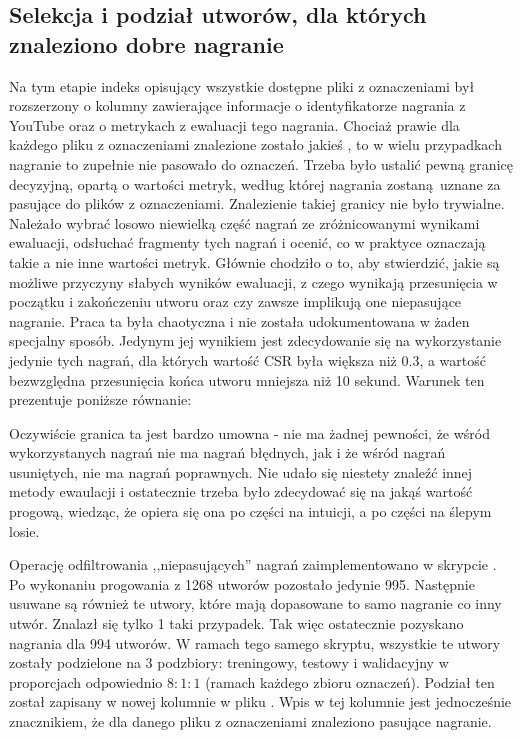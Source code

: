 \subsection{Selekcja i podział utworów, dla których znaleziono dobre nagranie}
Na tym etapie indeks opisujący wszystkie dostępne pliki z oznaczeniami był rozszerzony o kolumny
zawierające informacje o identyfikatorze nagrania z YouTube oraz o metrykach z ewaluacji tego
nagrania. Chociaż prawie dla każdego pliku z oznaczeniami znalezione zostało jakieś
, to w wielu przypadkach nagranie to zupełnie nie pasowało do oznaczeń. Trzeba było
ustalić pewną granicę decyzyjną, opartą o wartości metryk, według której nagrania zostaną uznane za
pasujące do plików z oznaczeniami. Znalezienie takiej granicy nie było trywialne. Należało wybrać
losowo niewielką część nagrań ze zróżnicowanymi wynikami ewaluacji, odsłuchać fragmenty tych nagrań
i ocenić, co w praktyce oznaczają takie a nie inne wartości metryk. Głównie chodziło o to, aby
stwierdzić, jakie są możliwe przyczyny słabych wyników ewaluacji, z czego wynikają przesunięcia w
początku i zakończeniu utworu oraz czy zawsze implikują one niepasujące nagranie. Praca ta była
chaotyczna i nie została udokumentowana w żaden specjalny sposób. Jedynym jej wynikiem jest
zdecydowanie się na wykorzystanie jedynie tych nagrań, dla których wartość CSR była większa niż
0.3, a wartość bezwzględna przesunięcia końca utworu mniejsza niż 10 sekund. Warunek ten prezentuje
poniższe równanie:
\begin{center}
\end{center}
Oczywiście granica ta jest bardzo umowna - nie ma żadnej pewności, że wśród wykorzystanych nagrań
nie ma nagrań błędnych, jak i że wśród nagrań usuniętych, nie ma nagrań poprawnych. Nie udało się
niestety znaleźć innej metody ewaulacji i ostatecznie trzeba było zdecydować się na jakąś wartość
progową, wiedząc, że opiera się ona po części na intuicji, a po części na ślepym losie.

Operację odfiltrowania ,,niepasujących'' nagrań zaimplementowano w skrypcie
. Po wykonaniu progowania z 1268 utworów
pozostało jedynie 995. Następnie usuwane są również te utwory, które mają dopasowane to samo
nagranie co inny utwór. Znalazł się tylko 1 taki przypadek. Tak więc ostatecznie pozyskano nagrania
dla 994 utworów. W ramach tego samego skryptu, wszystkie te utwory zostały podzielone na 3
podzbiory: treningowy, testowy i walidacyjny w proporcjach odpowiednio $8:1:1$ (ramach każdego
zbioru oznaczeń). Podział ten został zapisany w nowej kolumnie  w pliku
. Wpis w tej kolumnie jest jednocześnie znacznikiem, że dla danego pliku z
oznaczeniami znaleziono pasujące nagranie.

